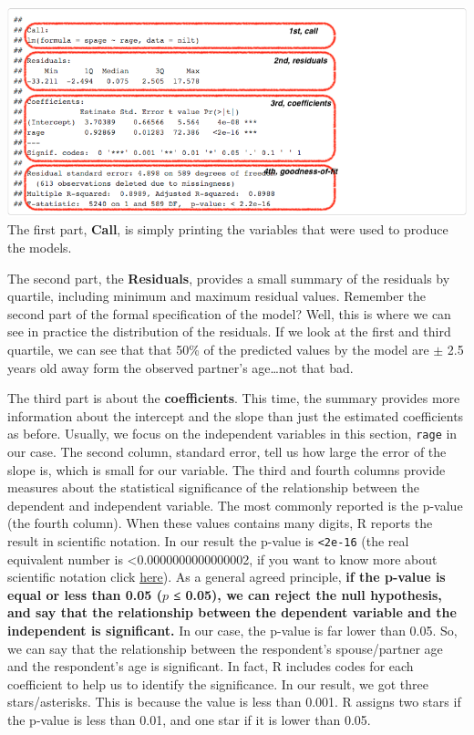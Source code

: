 \documentclass[
]{book}
\begin{document}
\includegraphics{./images/r_studio_lab6_model_summary.png}
The first part, \textbf{Call}, is simply printing the variables that were used to produce the models.

The second part, the \textbf{Residuals}, provides a small summary of the residuals by quartile, including minimum and maximum residual values. Remember the second part of the formal specification of the model? Well, this is where we can see in practice the distribution of the residuals. If we look at the first and third quartile, we can see that that 50\% of the predicted values by the model are \(\pm\) 2.5 years old away form the observed partner's age\ldots not that bad.

The third part is about the \textbf{coefficients}. This time, the summary provides more information about the intercept and the slope than just the estimated coefficients as before. Usually, we focus on the independent variables in this section, \texttt{rage} in our case. The second column, standard error, tell us how large the error of the slope is, which is small for our variable. The third and fourth columns provide measures about the statistical significance of the relationship between the dependent and independent variable. The most commonly reported is the p-value (the fourth column). When these values contains many digits, R reports the result in scientific notation. In our result the p-value is \texttt{\textless{}2e-16} (the real equivalent number is \textless0.0000000000000002, if you want to know more about scientific notation click \href{https://www.calculatorsoup.com/calculators/math/scientific-notation-converter.php\#:~:text=The\%20proper\%20format\%20for\%20scientific,equivalent\%20to\%20the\%20original\%20number.}{here}). As a general agreed principle, \textbf{if the p-value is equal or less than 0.05 (\(p\) ≤ 0.05), we can reject the null hypothesis, and say that the relationship between the dependent variable and the independent is significant.} In our case, the p-value is far lower than 0.05. So, we can say that the relationship between the respondent's spouse/partner age and the respondent's age is significant. In fact, R includes codes for each coefficient to help us to identify the significance. In our result, we got three stars/asterisks. This is because the value is less than 0.001. R assigns two stars if the p-value is less than 0.01, and one star if it is lower than 0.05.
\end{document}
